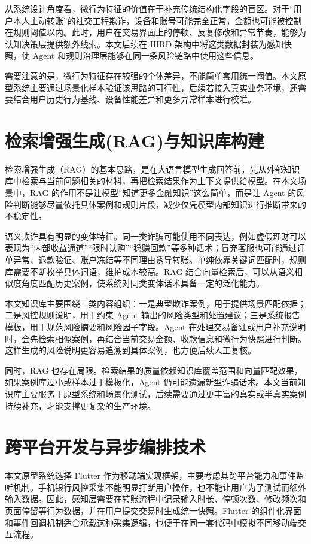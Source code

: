 \documentclass{xduugthesis}
\begin{document}
从系统设计角度看，微行为特征的价值在于补充传统结构化字段的盲区。对于“用户本人主动转账”的社交工程欺诈，设备和账号可能完全正常，金额也可能被控制在规则阈值以内。此时，用户在交易界面上的停顿、反复修改和异常节奏，能够为认知决策层提供额外线索。本文后续在 HIRD 架构中将这类数据封装为感知快照，使 Agent 和规则治理层能够在同一条风险链路中使用这些信息。

需要注意的是，微行为特征存在较强的个体差异，不能简单套用统一阈值。本文原型系统主要通过场景化样本验证该思路的可行性，后续若接入真实业务环境，还需要结合用户历史行为基线、设备性能差异和更多异常样本进行校准。

\section{检索增强生成(RAG)与知识库构建}
检索增强生成（RAG）的基本思路，是在大语言模型生成回答前，先从外部知识库中检索与当前问题相关的材料，再把检索结果作为上下文提供给模型\cite{srinivasan2025rag}。在本文场景中，RAG 的作用不是让模型“知道更多金融知识”这么简单，而是让 Agent 的风险判断能够尽量依托具体案例和规则片段，减少仅凭模型内部知识进行推断带来的不稳定性。

语义欺诈具有明显的变体特征。同一类诈骗可能使用不同表达，例如虚假理财可以表现为“内部收益通道”“限时认购”“稳赚回款”等多种话术；冒充客服也可能通过订单异常、退款验证、账户冻结等不同理由诱导转账。单纯依靠关键词匹配时，规则库需要不断枚举具体词语，维护成本较高。RAG 结合向量检索后，可以从语义相似度角度匹配历史案例，使系统对同类变体话术具备一定的泛化能力。

本文知识库主要围绕三类内容组织：一是典型欺诈案例，用于提供场景匹配依据；二是风控规则说明，用于约束 Agent 输出的风险类型和处置建议；三是系统报告模板，用于规范风险摘要和风险因子字段。Agent 在处理交易备注或用户补充说明时，会先检索相似案例，再结合当前交易金额、收款信息和微行为快照进行判断。这样生成的风险说明更容易追溯到具体案例，也方便后续人工复核。

同时，RAG 也存在局限。检索结果的质量依赖知识库覆盖范围和向量匹配效果，如果案例库过小或样本过于模板化，Agent 仍可能遗漏新型诈骗话术。本文当前知识库主要服务于原型系统和场景化测试，后续需要通过更丰富的真实或半真实案例持续补充，才能支撑更复杂的生产环境。

\section{跨平台开发与异步编排技术}
本文原型系统选择 Flutter 作为移动端实现框架，主要考虑其跨平台能力和事件监听机制。手机银行风控采集不能明显打断用户操作，也不能让用户为了测试而额外输入数据。因此，感知层需要在转账流程中记录输入时长、停顿次数、修改频次和页面停留等行为数据，并在用户提交交易时生成统一快照。Flutter 的组件化界面和事件回调机制适合承载这种采集逻辑，也便于在同一套代码中模拟不同移动端交互流程。
\end{document}
